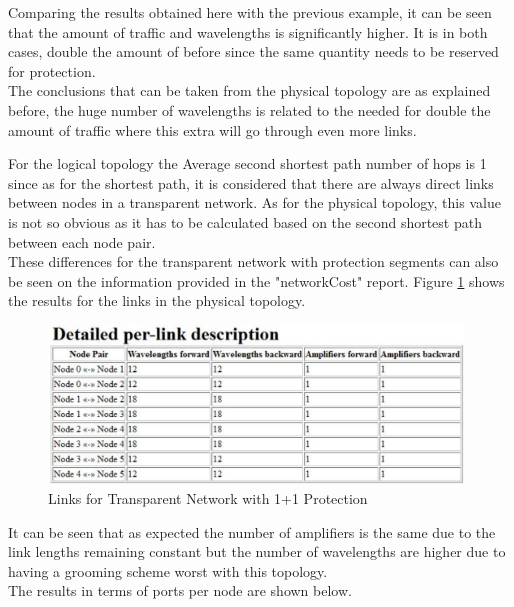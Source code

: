 		
		Comparing the results obtained here with the previous example, it can be seen that the amount of traffic and wavelengths is significantly higher. It is in both cases, double the amount of before since the same quantity needs to be reserved for protection.\\
		

		
		The conclusions that can be taken from the physical topology are as explained before, the huge number of wavelengths is related to the needed for double the amount of traffic where this extra will go through even more links.
		
		For the logical topology the Average second shortest path number of hops is 1 since as for the shortest path, it is considered that there are always direct links between nodes in a transparent network. As for the physical topology, this value is not so obvious as it has to be calculated based on the second shortest path between each node pair. \\
		
			
	
			
		These differences for the transparent network with protection segments can also be seen on the information provided in the "networkCost" report. Figure \ref{networkCost_Report_Links_Transparent11} shows the results for the links in the physical topology.\\
		
		\begin{figure}[!h]
			\centering
			\includegraphics[width=11cm]{networkCost_Report_Links_Transparent11.pdf}
			\caption{Links for Transparent Network with 1+1 Protection}
			\label{networkCost_Report_Links_Transparent11}						
		\end{figure}	
		
		It can be seen that as expected the number of amplifiers is the same due to the link lengths remaining constant but the number of wavelengths are higher due to having a grooming scheme worst with this topology.\\
		\newpage
		The results in terms of ports per node are shown below.
		

